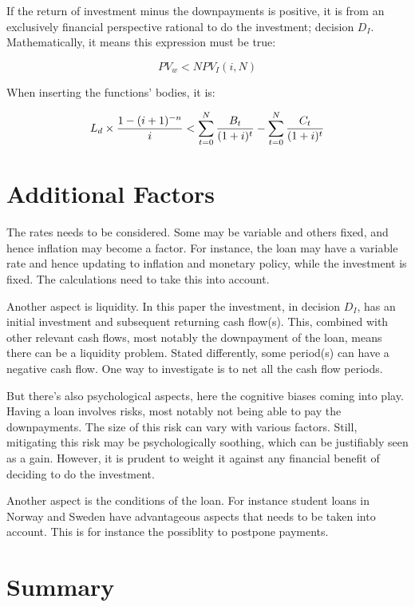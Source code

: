 \documentclass[a4paper]{article}
\begin{document}
If the return of investment minus the downpayments is positive, it is from an
exclusively financial perspective rational to do the investment; decision $D_I$.
Mathematically, it means this expression must be true:

\begin{equation}
    PV_w < NPV_I(i, N)
\end{equation}

When inserting the functions' bodies, it is:

\begin{equation}
    \PV_w < \NPV_I
\end{equation}

\section{Additional Factors}

The rates needs to be considered. Some may be variable and others fixed, and
hence inflation may become a factor. For instance, the loan may have a variable
rate and hence updating to inflation and monetary policy, while the investment
is fixed. The calculations need to take this into account.

Another aspect is liquidity. In this paper the investment, in decision $D_I$,
has an initial investment and subsequent returning cash flow(s). This, combined
with other relevant cash flows, most notably the downpayment of the loan, means
there can be a liquidity problem. Stated differently, some period(s) can have a
negative cash flow. One way to investigate is to net all the cash flow periods.

But there's also psychological aspects, here the cognitive biases coming into
play. Having a loan involves risks, most notably not being able to pay the
downpayments. The size of this risk can vary with various factors. Still,
mitigating this risk may be psychologically soothing, which can be justifiably
seen as a gain. However, it is prudent to weight it against any financial
benefit of deciding to do the investment.

Another aspect is the conditions of the loan. For instance student loans in
Norway and Sweden have advantageous aspects that needs to be taken into account.
This is for instance the possiblity to postpone payments.

\section{Summary}
\end{document}

